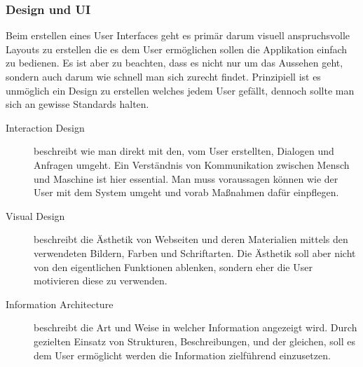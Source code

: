 \subsubsection{Design und UI}
\label{subsec:WAppDesign}

Beim erstellen eines User Interfaces geht es primär darum visuell anspruchsvolle Layouts zu erstellen die es dem User ermöglichen sollen die Applikation einfach zu bedienen. Es ist aber zu beachten, dass es nicht nur um das Aussehen geht, sondern auch darum wie schnell man sich zurecht findet. Prinzipiell ist es unmöglich ein Design zu erstellen welches jedem User gefällt, dennoch sollte man sich an gewisse Standards halten.

\begin{description}
\item[Interaction Design]
beschreibt wie man direkt mit den, vom User erstellten, Dialogen und Anfragen umgeht. Ein Verständnis von Kommunikation zwischen Mensch und Maschine ist hier essential. Man muss voraussagen können wie der User mit dem System umgeht und vorab Maßnahmen dafür einpflegen.

\item[Visual Design]
beschreibt die Ästhetik von Webseiten und deren Materialien mittels den verwendeten Bildern, Farben und Schriftarten. Die Ästhetik soll aber nicht von den eigentlichen Funktionen ablenken, sondern eher die User motivieren diese zu verwenden.

\item[Information Architecture]
beschreibt die Art und Weise in welcher Information angezeigt wird. Durch gezielten Einsatz von Strukturen, Beschreibungen, und der gleichen, soll es dem User ermöglicht werden die Information zielführend einzusetzen.
\end{description}

